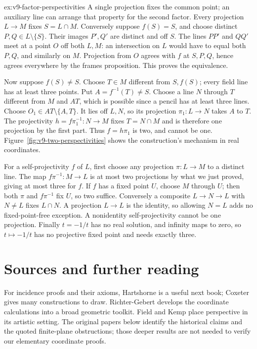 \begin{solution}{ex:v9-factor-perspectivities}
\idea A single projection fixes the common point; an auxiliary line can arrange that property for the second factor.
\writeup Every projection $L\to M$ fixes $S=L\cap M$. Conversely suppose $f(S)=S$, and choose distinct $P,Q\in L\setminus\{S\}$. Their images $P',Q'$ are distinct and off $S$. The lines $PP'$ and $QQ'$ meet at a point $O$ off both $L,M$: an intersection on $L$ would have to equal both $P,Q$, and similarly on $M$. Projection from $O$ agrees with $f$ at $S,P,Q$, hence agrees everywhere by the frames proposition. This proves the equivalence.

Now suppose $f(S)\ne S$. Choose $T\in M$ different from $S,f(S)$; every field line has at least three points. Put $A=f^{-1}(T)\ne S$. Choose a line $N$ through $T$ different from $M$ and $AT$, which is possible since a pencil has at least three lines. Choose $O_1\in AT\setminus\{A,T\}$. It lies off $L,N$, so its projection $\pi_1:L\to N$ takes $A$ to $T$. The projectivity $h=f\pi_1^{-1}:N\to M$ fixes $T=N\cap M$ and is therefore one projection by the first part. Thus $f=h\pi_1$ is two, and cannot be one. Figure~\ref{fig:v9-two-perspectivities} shows the construction's mechanism in real coordinates.

For a self-projectivity $f$ of $L$, first choose any projection $\pi:L\to M$ to a distinct line. The map $f\pi^{-1}:M\to L$ is at most two projections by what we just proved, giving at most three for $f$. If $f$ has a fixed point $U$, choose $M$ through $U$; then both $\pi$ and $f\pi^{-1}$ fix $U$, so two suffice. Conversely a composite $L\to N\to L$ with $N\ne L$ fixes $L\cap N$. A projection $L\to L$ is the identity, so allowing $N=L$ adds no fixed-point-free exception. A nonidentity self-projectivity cannot be one projection. Finally $t=-1/t$ has no real solution, and infinity maps to zero, so $t\mapsto-1/t$ has no projective fixed point and needs exactly three.
\end{solution}

\section*{Sources and further reading}

For incidence proofs and their axioms, Hartshorne is a useful next book; Coxeter gives many constructions to draw. Richter-Gebert develops the coordinate calculations into a broad geometric toolkit. Field and Kemp place perspective in its artistic setting. The original papers below identify the historical claims and the quoted finite-plane obstructions; those deeper results are not needed to verify our elementary coordinate proofs.


